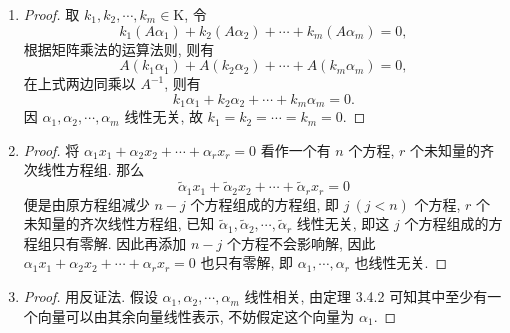 \documentclass[a4paper, 11pt]{ctexart}
\begin{document}
\begin{enumerate}
\begin{proof}
            若 $\alpha_1, \alpha_2, \cdots, \alpha_m, \beta$ 线性相关. 取 $k_1, \cdots, k_{m+1} \in \mathrm{K}$, 令
            \[
                k_1\alpha_1 + k_2\alpha_2 + \cdots + k_{m}\alpha_m + k_{m+1}\beta = 0,    
            \]
            若 $k_{m+1} = 0$, 即 $k_1\alpha_1 + k_2\alpha_2 + \cdots + k_{m}\alpha_m = 0$, 因 $\alpha_1, \cdots, \alpha_m$ 线性无关, 所以 $k_1 = \cdots = k_m = 0$.
            表明 $\alpha_1, \cdots, \alpha_m, \beta$ 线性无关, 与前提矛盾. 因此必有 $k_{m+1} \not= 0$, 则有
            \[
                \beta = -\frac{k_1}{k_{m+1}}\alpha_1 - \cdots -\frac{k_{m}}{k_{m+1}}\alpha_m,   
            \]
            即 $\beta$ 可由 $\alpha_1, \alpha_2, \cdots, \alpha_m$ 线性表示.
        \end{proof}
    \item %
        \begin{proof}
            取 $k_1, k_2, \cdots, k_m \in \mathrm{K}$, 令
            \[
                k_1(A\alpha_1) + k_2(A\alpha_2) + \cdots + k_m(A\alpha_m) = 0,  
            \]
            根据矩阵乘法的运算法则, 则有
            \[
                A(k_1\alpha_1) + A(k_2\alpha_2) + \cdots + A(k_m\alpha_m) = 0,    
            \]
            在上式两边同乘以 $A^{-1}$, 则有
            \[
                k_1\alpha_1 + k_2\alpha_2 + \cdots + k_m\alpha_m = 0.    
            \]
            因 $\alpha_1, \alpha_2, \cdots, \alpha_m$ 线性无关, 故 $k_1 = k_2 = \cdots = k_m = 0$.
        \end{proof}
    \item %
        \begin{proof}
            将 $\alpha_1x_1 + \alpha_2x_2 + \cdots + \alpha_rx_r = 0$ 看作一个有 $n$ 个方程, $r$ 个未知量的齐次线性方程组.
            那么
            \begin{equation}
                \widetilde{\alpha}_1x_1 + \widetilde{\alpha}_2x_2 + \cdots + \widetilde{\alpha}_rx_r = 0
            \end{equation}
            便是由原方程组减少 $n-j$ 个方程组成的方程组, 即 $j\ (j < n)$ 个方程, $r$ 个未知量的齐次线性方程组, 已知 $\widetilde{\alpha}_1, \widetilde{\alpha}_2, \cdots, \widetilde{\alpha}_r$ 线性无关, 即这 $j$ 个方程组成的方程组只有零解.
            因此再添加 $n-j$ 个方程不会影响解, 因此 $\alpha_1x_1 + \alpha_2x_2 + \cdots + \alpha_rx_r = 0$ 也只有零解, 即 $\alpha_1, \cdots, \alpha_r$ 也线性无关. 
        \end{proof}
    \item %
        \begin{proof}
            用反证法. 假设 $\alpha_1, \alpha_2, \cdots, \alpha_m$ 线性相关, 由定理 3.4.2 可知其中至少有一个向量可以由其余向量线性表示, 不妨假定这个向量为 $\alpha_1$.

\end{proof}
\end{enumerate}
\end{document}
